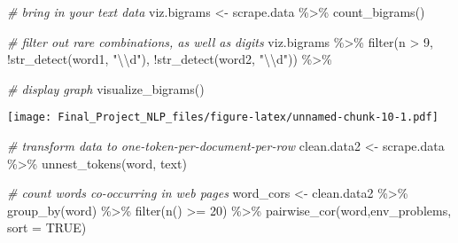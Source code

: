 \documentclass[
]{article}
\newenvironment{Shaded}{\begin{snugshade}}{\end{snugshade}}
\newcommand{\AttributeTok}[1]{\textcolor[rgb]{0.77,0.63,0.00}{#1}}
\newcommand{\CommentTok}[1]{\textcolor[rgb]{0.56,0.35,0.01}{\textit{#1}}}
\newcommand{\ConstantTok}[1]{\textcolor[rgb]{0.00,0.00,0.00}{#1}}
\newcommand{\DecValTok}[1]{\textcolor[rgb]{0.00,0.00,0.81}{#1}}
\newcommand{\FunctionTok}[1]{\textcolor[rgb]{0.00,0.00,0.00}{#1}}
\newcommand{\NormalTok}[1]{#1}
\newcommand{\OtherTok}[1]{\textcolor[rgb]{0.56,0.35,0.01}{#1}}
\newcommand{\SpecialCharTok}[1]{\textcolor[rgb]{0.00,0.00,0.00}{#1}}
\newcommand{\StringTok}[1]{\textcolor[rgb]{0.31,0.60,0.02}{#1}}
\begin{document}
\begin{Shaded}
\begin{Highlighting}[]
\CommentTok{\# bring in your text data}
\NormalTok{viz.bigrams }\OtherTok{\textless{}{-}}\NormalTok{ scrape.data }\SpecialCharTok{\%\textgreater{}\%}
  \FunctionTok{count\_bigrams}\NormalTok{()}

\CommentTok{\# filter out rare combinations, as well as digits}
\NormalTok{viz.bigrams }\SpecialCharTok{\%\textgreater{}\%}
  \FunctionTok{filter}\NormalTok{(n }\SpecialCharTok{\textgreater{}} \DecValTok{9}\NormalTok{,}
         \SpecialCharTok{!}\FunctionTok{str\_detect}\NormalTok{(word1, }\StringTok{"}\SpecialCharTok{\textbackslash{}\textbackslash{}}\StringTok{d"}\NormalTok{),}
         \SpecialCharTok{!}\FunctionTok{str\_detect}\NormalTok{(word2, }\StringTok{"}\SpecialCharTok{\textbackslash{}\textbackslash{}}\StringTok{d"}\NormalTok{)) }\SpecialCharTok{\%\textgreater{}\%}
  
  \CommentTok{\# display graph}
  \FunctionTok{visualize\_bigrams}\NormalTok{()}
\end{Highlighting}
\end{Shaded}

\texttt{[image: Final\_Project\_NLP\_files/figure-latex/unnamed-chunk-10-1.pdf]}

\begin{Shaded}
\begin{Highlighting}[]
\CommentTok{\# transform data to one{-}token{-}per{-}document{-}per{-}row}
\NormalTok{clean.data2 }\OtherTok{\textless{}{-}}\NormalTok{ scrape.data }\SpecialCharTok{\%\textgreater{}\%}
  \FunctionTok{unnest\_tokens}\NormalTok{(word, text)}

\CommentTok{\# count words co{-}occurring in web pages}
\NormalTok{word\_cors }\OtherTok{\textless{}{-}}\NormalTok{ clean.data2 }\SpecialCharTok{\%\textgreater{}\%}
  \FunctionTok{group\_by}\NormalTok{(word) }\SpecialCharTok{\%\textgreater{}\%}
  \FunctionTok{filter}\NormalTok{(}\FunctionTok{n}\NormalTok{() }\SpecialCharTok{\textgreater{}=} \DecValTok{20}\NormalTok{) }\SpecialCharTok{\%\textgreater{}\%}
  \FunctionTok{pairwise\_cor}\NormalTok{(word,env\_problems,  }\AttributeTok{sort =} \ConstantTok{TRUE}\NormalTok{)}
\end{Highlighting}
\end{Shaded}

\hypertarget{section-1}{%
\subparagraph{}\label{section-1}}
\end{document}
